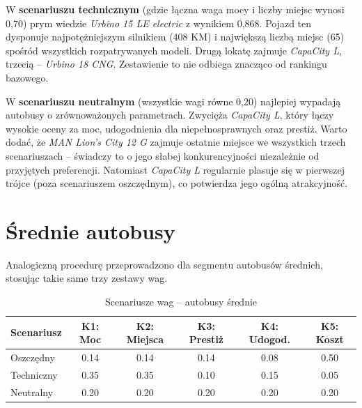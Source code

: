 W \textbf{scenariuszu technicznym} (gdzie łączna waga mocy i liczby miejsc wynosi 0,70) prym wiedzie \textit{Urbino 15 LE electric} z wynikiem 0,868. Pojazd ten dysponuje najpotężniejszym silnikiem (408 KM) i największą liczbą miejsc (65) spośród wszystkich rozpatrywanych modeli. Drugą lokatę zajmuje \textit{CapaCity L}, trzecią -- \textit{Urbino 18 CNG}. Zestawienie to nie odbiega znacząco od rankingu bazowego.

W \textbf{scenariuszu neutralnym} (wszystkie wagi równe 0,20) najlepiej wypadają autobusy o zrównoważonych parametrach. Zwycięża \textit{CapaCity L}, który łączy wysokie oceny za moc, udogodnienia dla niepełnosprawnych oraz prestiż. Warto dodać, że \textit{MAN Lion's City 12 G} zajmuje ostatnie miejsce we wszystkich trzech scenariuszach -- świadczy to o jego słabej konkurencyjności niezależnie od przyjętych preferencji. Natomiast \textit{CapaCity L} regularnie plasuje się w pierwszej trójce (poza scenariuszem oszczędnym), co potwierdza jego ogólną atrakcyjność.


\section{Średnie autobusy}

Analogiczną procedurę przeprowadzono dla segmentu autobusów średnich, stosując takie same trzy zestawy wag.

\begin{table}[H]
    \centering
    \caption{Scenariusze wag -- autobusy średnie}
    \vspace{0.2cm}
    \begin{tabular}{|l|c|c|c|c|c|}
        \hline
        \textbf{Scenariusz} & \textbf{K1: Moc} & \textbf{K2: Miejsca} & \textbf{K3: Prestiż} & \textbf{K4: Udogod.} & \textbf{K5: Koszt} \\ \hline
        Oszczędny  & 0.14 & 0.14 & 0.14 & 0.08 & 0.50 \\ \hline
        Techniczny & 0.35 & 0.35 & 0.10 & 0.15 & 0.05 \\ \hline
        Neutralny  & 0.20 & 0.20 & 0.20 & 0.20 & 0.20 \\ \hline
    \end{tabular}
\end{table}

